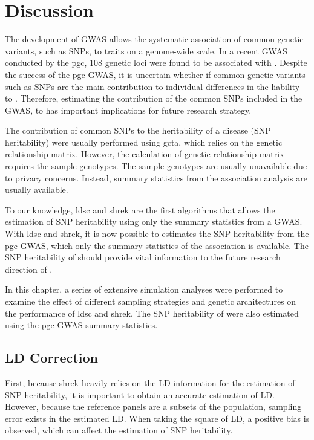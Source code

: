 	\section{Discussion}
	The development of \gls{GWAS} allows the systematic association of common genetic variants, such as \glspl{SNP}, to traits on a genome-wide scale.
	In a recent \gls{GWAS} conducted by the \gls{pgc}, 108 genetic loci were found to be associated with  \citep{Ripke2014}.
	Despite the success of the \gls{pgc}  \gls{GWAS}, it is uncertain whether if common genetic variants such as \glspl{SNP} are the main contribution to individual differences in the liability to .
	Therefore, estimating the contribution of the common \glspl{SNP} included in the \gls{GWAS}, to  has important implications for future research strategy. 
	
	The contribution of common \glspl{SNP} to the heritability of a disease (\gls{SNP} heritability) were usually performed using \gls{gcta}, which relies on the genetic relationship matrix.
	However, the calculation of genetic relationship matrix requires the sample genotypes.
	The sample genotypes are usually unavailable due to privacy concerns.
	Instead, summary statistics from the association analysis are usually available.

	To our knowledge, \gls{ldsc} and \gls{shrek} are the first algorithms that allows the estimation of \gls{SNP} heritability using only the summary statistics from a \gls{GWAS}.
	With \gls{ldsc} and \gls{shrek}, it is now possible to estimates the \gls{SNP} heritability from the \gls{pgc}  \gls{GWAS}, which only the summary statistics of the association is available.
	The \gls{SNP} heritability of  should provide vital information to the future research direction of .
	
	
	In this chapter, a series of extensive simulation analyses were performed to examine the effect of different sampling strategies and genetic architectures on the performance of \gls{ldsc} and \gls{shrek}.
	The \gls{SNP} heritability of  were also estimated using the \gls{pgc}  \gls{GWAS} summary statistics.
	
	\subsection{LD Correction}
	First, because \gls{shrek} heavily relies on the \gls{LD} information for the estimation of \gls{SNP} heritability, it is important to obtain an accurate estimation of \gls{LD}.
	However, because the reference panels are a subsets of the population, sampling error exists in the estimated \gls{LD}.
	When taking the square of \gls{LD}, a positive bias is observed, which can affect the estimation of \gls{SNP} heritability.
	
